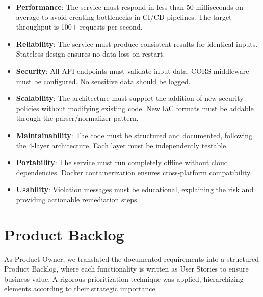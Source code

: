 \begin{itemize}
    \item \textbf{Performance}: The service must respond in less than 50 milliseconds on average to avoid creating bottlenecks in CI/CD pipelines. The target throughput is 100+ requests per second.
    \item \textbf{Reliability}: The service must produce consistent results for identical inputs. Stateless design ensures no data loss on restart.
    \item \textbf{Security}: All API endpoints must validate input data. CORS middleware must be configured. No sensitive data should be logged.
    \item \textbf{Scalability}: The architecture must support the addition of new security policies without modifying existing code. New IaC formats must be addable through the parser/normalizer pattern.
    \item \textbf{Maintainability}: The code must be structured and documented, following the 4-layer architecture. Each layer must be independently testable.
    \item \textbf{Portability}: The service must run completely offline without cloud dependencies. Docker containerization ensures cross-platform compatibility.
    \item \textbf{Usability}: Violation messages must be educational, explaining the risk and providing actionable remediation steps.
\end{itemize}

\section{Product Backlog}

As Product Owner, we translated the documented requirements into a structured Product Backlog, where each functionality is written as User Stories to ensure business value. A rigorous prioritization technique was applied, hierarchizing elements according to their strategic importance.

